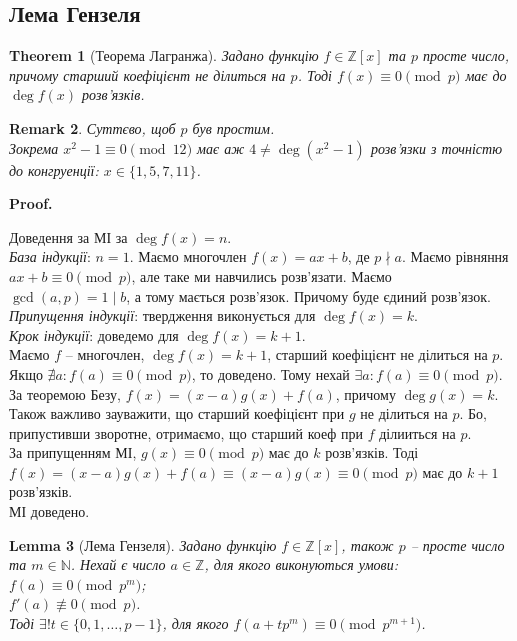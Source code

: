\documentclass[a4paper, 10pt]{article}
\makeatletter
\theoremstyle{theoremdd}
\newtheorem{theorem}{Theorem}[subsection]
\theoremstyle{theoremdd}
\theoremstyle{theoremdd}
\theoremstyle{theoremdd}
\theoremstyle{theoremdd}
\theoremstyle{theoremdd}
\newtheorem{remark}[theorem]{Remark}
\theoremstyle{theoremdd}
\newtheorem{lemma}[theorem]{Lemma}
\theoremstyle{theoremdd}
\renewenvironment{proof}[1][Proof.\\]{\par
\pushQED{\hfill \qed}%
\normalfont \topsep6\p@\@plus6\p@\relax
\trivlist
\item\relax
{\bfseries
#1\@addpunct{.}}\hspace\labelsep\ignorespaces
}{%
\popQED\endtrivlist\@endpefalse
}
\makeatother
\begin{document}
\subsection{Лема Гензеля}
\begin{theorem}[Теорема Лагранжа]
Задано функцію $f \in \mathbb{Z}[x]$ та $p$ просте число, причому старший коефіцієнт не ділиться на $p$. Тоді $f(x) \equiv 0 \pmod p$ має до $\deg f(x)$ розв'язків.
\end{theorem}

\begin{remark}
Суттєво, щоб $p$ був простим.\\
Зокрема $x^2 -1 \equiv 0 \pmod {12}$ має аж $4 \neq \deg (x^2-1)$ розв'язки з точністю до конгруенції: $x \in \{1,5,7,11\}$.
\end{remark}

\begin{proof}
Доведення за МІ за $\deg f(x) = n$.\\
\textit{База індукції}: $n = 1$. Маємо многочлен $f(x) = ax+b$, де $p \nmid a$. Маємо рівняння $ax+b \equiv 0 \pmod p$, але таке ми навчились розв'язати. Маємо $\gcd(a,p) = 1 \mid b$, а тому мається розв'язок. Причому буде єдиний розв'язок.\\
\textit{Припущення індукції}: твердження виконується для $\deg f(x) = k$.\\ \textit{Крок індукції}: доведемо для $\deg f(x) = k+1$.\\
Маємо $f$ -- многочлен, $\deg f(x) = k+1$, старший коефіцієнт не ділиться на $p$. Якщо $\nexists a: f(a) \equiv 0 \pmod p$, то доведено. Тому нехай $\exists a: f(a) \equiv 0 \pmod p$. За теоремою Безу, $f(x) = (x-a)g(x) + f(a)$, причому $\deg g(x) = k$. Також важливо зауважити, що старший коефіцієнт при $g$ не ділиться на $p$. Бо, припустивши зворотне, отримаємо, що старший коеф при $f$ ділииться на $p$.\\
За припущенням МІ, $g(x) \equiv 0 \pmod p$ має до $k$ розв'язків. Тоді $f(x) = (x-a)g(x) + f(a) \equiv (x-a)g(x) \equiv 0 \pmod p$ має до $k+1$ розв'язків.\\
МІ доведено.
\end{proof}

\begin{lemma}[Лема Гензеля]
Задано функцію $f \in \mathbb{Z}[x]$, також $p$ -- просте число та $m \in \mathbb{N}$. Нехай є число $a \in \mathbb{Z}$, для якого виконуються умови:\\
$f(a) \equiv 0 \pmod {p^m}$;\\
$f'(a) \not\equiv 0 \pmod p$.\\
Тоді $\exists !t \in \{0,1,\dots,p-1\}$, для якого $f(a+tp^m) \equiv 0 \pmod{p^{m+1}}$.
\end{lemma}
\end{document}
